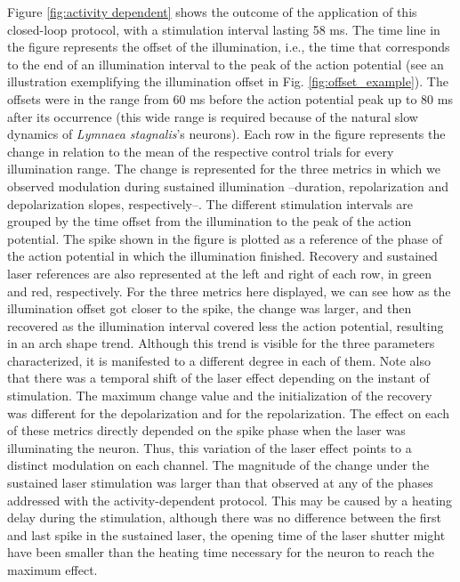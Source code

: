 Figure \ref{fig:activity dependent} shows the outcome of the application of this closed-loop protocol, with a stimulation interval lasting 58 ms. The time line in the figure represents the offset of the illumination, i.e., the time that corresponds to the end of an illumination interval to the peak of the action potential (see an illustration exemplifying the illumination offset in Fig. \ref{fig:offset_example}). The offsets were in the range from 60 ms before the action potential peak up to 80 ms after its occurrence (this wide range is required because of the natural slow dynamics of \textit{Lymnaea stagnalis}'s neurons). Each row in the figure represents the change in relation to the mean of the respective control trials for every illumination range. The change is represented for the three metrics in which we observed modulation during sustained illumination --duration, repolarization and depolarization slopes, respectively--. The different stimulation intervals are grouped by the time offset from the illumination to the peak of the action potential. The spike shown in the figure is plotted as a reference of the phase of the action potential in which the illumination finished. Recovery and sustained laser references are also represented at the left and right of each row, in green and red, respectively. For the three metrics here displayed, we can see how as the illumination offset got closer to the spike, the change was larger, and then recovered as the illumination interval covered less the action potential, resulting in an arch shape trend. Although this trend is visible for the three parameters characterized, it is manifested to a different degree in each of them. Note also that there was a temporal shift of the laser effect depending on the instant of stimulation. The maximum change value and the initialization of the recovery was different for the depolarization and for the repolarization. The effect on each of these metrics directly depended on the spike phase when the laser was illuminating the neuron. Thus, this variation of the laser effect points to a distinct modulation on each channel. The magnitude of the change under the sustained laser stimulation was larger than that observed at any of the phases addressed with the activity-dependent protocol. This may be caused by a heating delay during the stimulation, although there was no difference between the first and last spike in the sustained laser, the opening time of the laser shutter might have been smaller than the heating time necessary for the neuron to reach the maximum effect.

